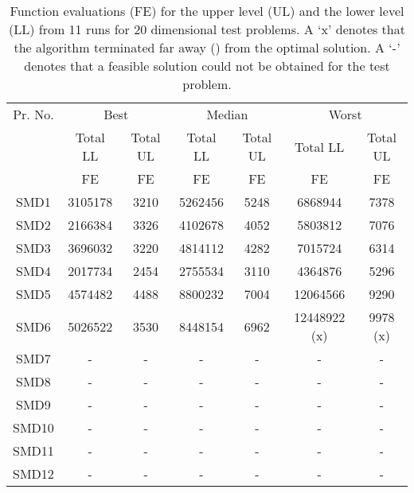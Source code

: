 \documentclass[twoside]{article}
\begin{document}
\begin{table*}[!ht]
\caption{Function evaluations (FE) for the upper level (UL) and the lower level (LL) from 11
  runs for 20 dimensional test problems. A `x' denotes that the algorithm terminated far away () from the optimal solution. A `-' denotes that a feasible solution could not be obtained for the test problem.} 
\label{tab:table3a}
{\small\begin{center}
\begin{tabular}{|c|c|c|c|c|c|c|} \hline
Pr. No.	&	\multicolumn{2}{|c|}{Best}	&	\multicolumn{2}{|c|}{Median}	&	\multicolumn{2}{|c|}{Worst}	\\	\cline{2-7}
	&		\multicolumn{1}{|c|}{Total LL}	&	\multicolumn{1}{|c|}{Total UL}	&	\multicolumn{1}{|c|}{Total LL}	&	\multicolumn{1}{|c|}{Total UL}	&	\multicolumn{1}{|c|}{Total LL}	&\multicolumn{1}{|c|}{Total UL}	\\	
	&	\multicolumn{1}{|c|}{FE} 	&
        \multicolumn{1}{|c|}{FE}	&\multicolumn{1}{|c|}{FE}         &\multicolumn{1}{|c|}{FE}        &
        \multicolumn{1}{|c|}{FE}& \multicolumn{1}{|c|}{FE}	\\ \hline	
SMD1 & 3105178 & 3210 & 5262456 & 5248 & 6868944 & 7378 \\	\hline
SMD2 & 2166384 & 3326 & 4102678 & 4052 & 5803812 & 7076 \\	\hline
SMD3 & 3696032 & 3220 & 4814112 & 4282 & 7015724 & 6314 \\	\hline
SMD4 & 2017734 & 2454 & 2755534 & 3110 & 4364876 & 5296 \\	\hline
SMD5 & 4574482 & 4488 & 8800232 & 7004 & 12064566 & 9290 \\	\hline
SMD6 & 5026522 & 3530 & 8448154 & 6962 & 12448922 (x) & 9978 (x) \\	\hline
SMD7 & - & - & - & - & - & -  \\	\hline
SMD8 & - & - & - & - & - & -  \\	\hline
SMD9 & - & - & - & - & - & -  \\	\hline
SMD10 & - & - & - & - & - & -  \\	\hline
SMD11 & -& -& -& -& -& - \\ \hline
SMD12 & -& -& -& -& -& - \\ \hline
\end{tabular}
\end{center}}
\end{table*}
\end{document}
